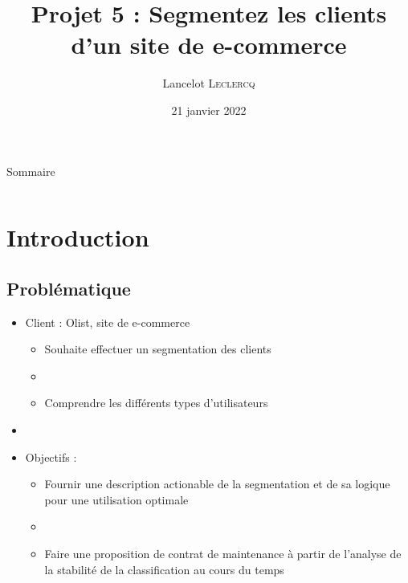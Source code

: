 \documentclass[8pt,aspectratio=169,hyperref={unicode=true}]{beamer}
\title[Segmentez les clients d'un site de e-commerce]
{Projet 5 : Segmentez les clients d'un site de e-commerce}
\author[Lancelot \textsc{Leclercq}]{Lancelot \textsc{Leclercq}}
\institute[]{}
\date[]{\small{21 janvier 2022}}
\begin{document}
\begin{frame}[plain]
    \titlepage
\end{frame}

\begin{frame}{Sommaire}
    \Large
    \begin{columns}
        \begin{column}{.7\textwidth}
            \tableofcontents[hideallsubsections]
        \end{column}
    \end{columns}
\end{frame}


\section{Introduction}
\subsection{Problématique}
\begin{frame}{\insertsubsection}
    \begin{itemize}
        \item Client : Olist, site de e-commerce
              \begin{itemize}
                  \item Souhaite effectuer un segmentation des clients
                  \item[]
                  \item Comprendre les différents types d'utilisateurs
              \end{itemize}
        \item[]
        \item Objectifs :
              \begin{itemize}
                  \item Fournir une description actionable de la segmentation et de sa logique pour une utilisation optimale
                  \item[]
                  \item Faire une proposition de contrat de maintenance à partir de l'analyse de la stabilité de la classification au cours du temps
              \end{itemize}
    \end{itemize}
\end{frame}
\end{document}
